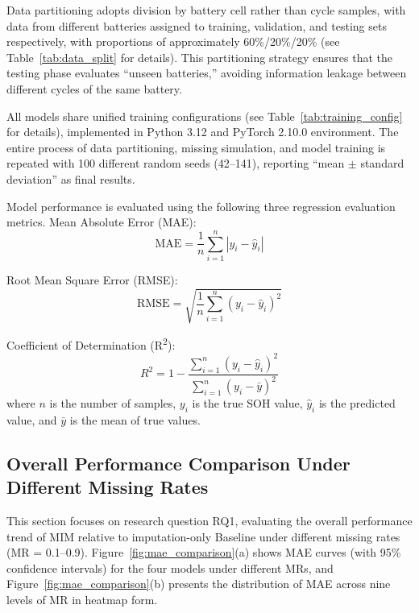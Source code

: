 \documentclass[5p,times]{elsarticle}
\begin{document}
Data partitioning adopts division by battery cell rather than cycle samples, with data from different batteries assigned to training, validation, and testing sets respectively, with proportions of approximately 60\%/20\%/20\% (see Table~\ref{tab:data_split} for details). This partitioning strategy ensures that the testing phase evaluates ``unseen batteries,'' avoiding information leakage between different cycles of the same battery.

All models share unified training configurations (see Table~\ref{tab:training_config} for details), implemented in Python 3.12 and PyTorch 2.10.0 environment. The entire process of data partitioning, missing simulation, and model training is repeated with 100 different random seeds (42--141), reporting ``mean $\pm$ standard deviation'' as final results.

Model performance is evaluated using the following three regression evaluation metrics. Mean Absolute Error (MAE):
\begin{equation}
    \text{MAE} = \frac{1}{n} \sum_{i=1}^{n} |y_i - \hat{y}_i|
    \label{eq:mae}
\end{equation}

Root Mean Square Error (RMSE):
\begin{equation}
    \text{RMSE} = \sqrt{\frac{1}{n} \sum_{i=1}^{n} (y_i - \hat{y}_i)^2}
    \label{eq:rmse}
\end{equation}

Coefficient of Determination (R\textsuperscript{2}):
\begin{equation}
    R^2 = 1 - \frac{\sum_{i=1}^{n} (y_i - \hat{y}_i)^2}{\sum_{i=1}^{n} (y_i - \bar{y})^2}
    \label{eq:r2}
\end{equation}
where $n$ is the number of samples, $y_i$ is the true SOH value, $\hat{y}_i$ is the predicted value, and $\bar{y}$ is the mean of true values.

\subsection{Overall Performance Comparison Under Different Missing Rates}

This section focuses on research question RQ1, evaluating the overall performance trend of MIM relative to imputation-only Baseline under different missing rates (MR = 0.1--0.9). Figure~\ref{fig:mae_comparison}(a) shows MAE curves (with 95\% confidence intervals) for the four models under different MRs, and Figure~\ref{fig:mae_comparison}(b) presents the distribution of MAE across nine levels of MR in heatmap form.
\end{document}
